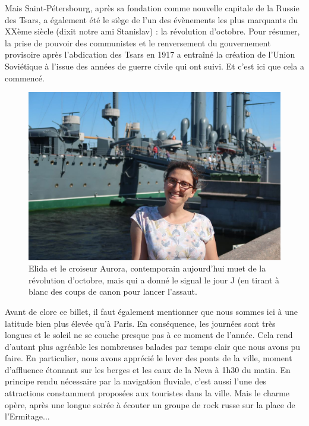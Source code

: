 Mais Saint-Pétersbourg, après sa fondation comme nouvelle capitale de la
Russie des Tsars, a également été le siège de l'un des évènements les
plus marquants du XXème siècle (dixit notre ami Stanislav) : la
révolution d'octobre. Pour résumer, la prise de pouvoir des communistes
et le renversement du gouvernement provisoire après l'abdication des
Tsars en 1917 a entraîné la création de l'Union Soviétique à l'issue des
années de guerre civile qui ont suivi. Et c'est ici que cela a commencé.

\begin{figure}
\centering
\includegraphics{images/20180606_Aurora.JPG}
\caption{Elida et le croiseur Aurora, contemporain aujourd'hui muet de
la révolution d'octobre, mais qui a donné le signal le jour J (en tirant
à blanc des coups de canon pour lancer l'assaut.}
\end{figure}

Avant de clore ce billet, il faut également mentionner que nous sommes
ici à une latitude bien plus élevée qu'à Paris. En conséquence, les
journées sont très longues et le soleil ne se couche presque pas à ce
moment de l'année. Cela rend d'autant plus agréable les nombreuses
balades par temps clair que nous avons pu faire. En particulier, nous
avons apprécié le lever des ponts de la ville, moment d'affluence
étonnant sur les berges et les eaux de la Neva à 1h30 du matin. En
principe rendu nécessaire par la navigation fluviale, c'est aussi l'une
des attractions constamment proposées aux touristes dans la ville. Mais
le charme opère, après une longue soirée à écouter un groupe de rock
russe sur la place de l'Ermitage...

